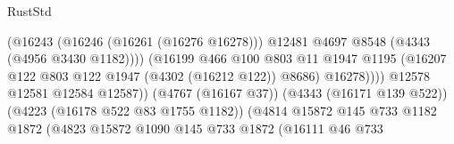 \begin{lexlean}{RustStd}
\begin{coremodule}
                                                        (@16243
                                                          (@16246 (@16261 (@16276 @16278)))
                                                          @12481
                                                          @4697
                                                          @8548
                                                          (@4343 (@4956 @3430 @1182))))
                                                      (@16199
                                                        @466
                                                        @100
                                                        @803
                                                        @11
                                                        @1947
                                                        @1195
                                                        (@16207
                                                          @122
                                                          @803
                                                          @122
                                                          @1947
                                                          (@4302 (@16212 @122))
                                                          @8686)
                                                        @16278))))
                                                @12578
                                                @12581
                                                @12584
                                                @12587))
                                            (@4767 (@16167 @37))
                                            (@4343 (@16171 @139 @522))
                                            (@4223 (@16178 @522 @83 @1755 @1182))
                                            (@4814
                                              @15872
                                              @145
                                              @733
                                              @1182
                                              @1872
                                              (@4823
                                                @15872
                                                @1090
                                                @145
                                                @733
                                                @1872
                                                (@16111
                                                  @46
                                                  @733

\end{coremodule}
\end{lexlean}
